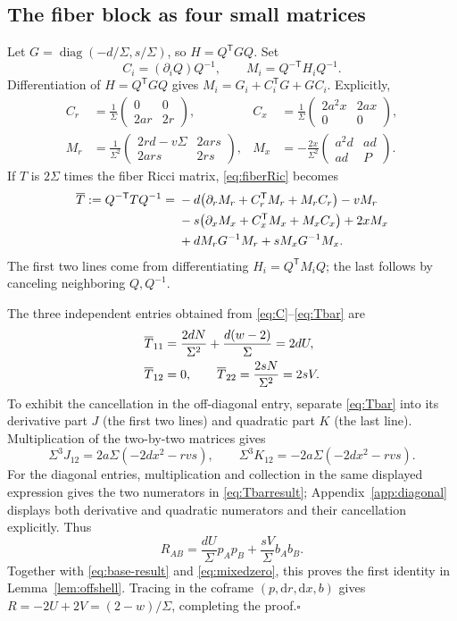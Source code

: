 \documentclass[11pt,a4paper]{article}
\numberwithin{equation}{section}
\theoremstyle{definition}\newtheorem{definition}[theorem]{Definition}
\theoremstyle{remark}\newtheorem{remark}[theorem]{Remark}
\newcommand{\dd}{\mathrm{d}}
\begin{document}
\subsection{The fiber block as four small matrices}
Let $G=\operatorname{diag}(-d/\Sigma,s/\Sigma)$, so $H=Q^{\mathsf T}GQ$. Set
\[
 C_i=(\partial_iQ)Q^{-1},\qquad M_i=Q^{-\mathsf T}H_iQ^{-1}.
\]
Differentiation of $H=Q^{\mathsf T}GQ$ gives $M_i=G_i+C_i^{\mathsf T}G+GC_i$. Explicitly,
\begin{align}
 C_r&=\frac1\Sigma\begin{pmatrix}0&0\\2ar&2r\end{pmatrix},&
 C_x&=\frac1\Sigma\begin{pmatrix}2a^2x&2ax\\0&0\end{pmatrix},\label{eq:C}\\
 M_r&=\frac1{\Sigma^2}\begin{pmatrix}2rd-v\Sigma&2ars\\2ars&2rs\end{pmatrix},&
 M_x&=-\frac{2x}{\Sigma^2}\begin{pmatrix}a^2d&ad\\ad&P\end{pmatrix}.\label{eq:M}
\end{align}
If $T$ is $2\Sigma$ times the fiber Ricci matrix, \eqref{eq:fiberRic} becomes
\begin{align}
 \overline T:=Q^{-\mathsf T}TQ^{-1}
 ={}&-d\bigl(\partial_rM_r+C_r^{\mathsf T}M_r+M_rC_r\bigr)-vM_r\notag\\
 &-s\bigl(\partial_xM_x+C_x^{\mathsf T}M_x+M_xC_x\bigr)+2xM_x\notag\\
 &+dM_rG^{-1}M_r+sM_xG^{-1}M_x.\label{eq:Tbar}
\end{align}
The first two lines come from differentiating $H_i=Q^{\mathsf T}M_iQ$; the last follows by canceling neighboring $Q,Q^{-1}$.

The three independent entries obtained from \eqref{eq:C}--\eqref{eq:Tbar} are
\begin{align}
 \overline T_{11}&=\frac{2dN}{\Sigma^2}+\frac{d(w-2)}{\Sigma}=2dU,\notag\\
 \overline T_{12}&=0,\qquad
 \overline T_{22}=\frac{2sN}{\Sigma^2}=2sV.\label{eq:Tbarresult}
\end{align}
To exhibit the cancellation in the off-diagonal entry, separate \eqref{eq:Tbar} into its derivative part $J$ (the first two lines) and quadratic part $K$ (the last line). Multiplication of the two-by-two matrices gives
\[
 \Sigma^3J_{12}=2a\Sigma(-2dx^2-rvs),\qquad
 \Sigma^3K_{12}=-2a\Sigma(-2dx^2-rvs).
\]
For the diagonal entries, multiplication and collection in the same displayed expression gives the two numerators in \eqref{eq:Tbarresult}; Appendix~\ref{app:diagonal} displays both derivative and quadratic numerators and their cancellation explicitly. Thus
\[
 R_{AB}=\frac{dU}{\Sigma}p_Ap_B+\frac{sV}{\Sigma}b_Ab_B.
\]
Together with \eqref{eq:base-result} and \eqref{eq:mixedzero}, this proves the first identity in Lemma~\ref{lem:offshell}. Tracing in the coframe $(p,\dd r,\dd x,b)$ gives $R=-2U+2V=(2-w)/\Sigma$, completing the proof.\hfill$\square$
\end{document}
